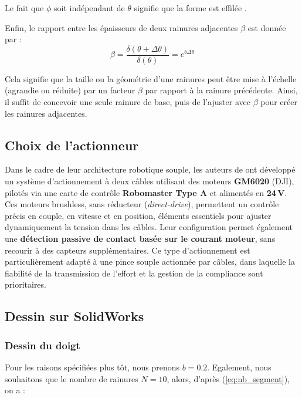 \documentclass[a4paper, 11pt]{report}
\begin{document}
            Le fait que $\phi$ soit indépendant de $\theta$ signifie que la forme est effilée \cite{wang_spirobs_2025}.

            Enfin, le rapport entre les épaisseurs de deux rainures adjacentes \(\beta\) est donnée par :
            \begin{equation}
            \beta = \frac{\delta(\theta + \Delta\theta)}{\delta(\theta)} = e^{b \Delta\theta}
            \label{eq:beta}
            \end{equation}
            
            Cela signifie que la taille ou la géométrie d’une rainures peut être mise à l’échelle (agrandie ou réduite) par un facteur $\beta$ par rapport à la rainure précédente. Ainsi, il suffit de concevoir une seule rainure de base, puis de l’ajuster avec $\beta$ pour créer les rainures adjacentes.

    \subsection{Choix de l'actionneur}

        Dans le cadre de leur architecture robotique souple, les auteurs de \cite{wang_spirobs_2025} ont développé un système d’actionnement à deux câbles utilisant des moteurs \textbf{GM6020} (DJI), pilotés via une carte de contrôle \textbf{Robomaster Type A} et alimentés en \textbf{24\,V}. Ces moteurs brushless, sans réducteur (\emph{direct-drive}), permettent un contrôle précis en couple, en vitesse et en position, éléments essentiels pour ajuster dynamiquement la tension dans les câbles. Leur configuration permet également une \textbf{détection passive de contact basée sur le courant moteur}, sans recourir à des capteurs supplémentaires. Ce type d’actionnement est particulièrement adapté à une pince souple actionnée par câbles, dans laquelle la fiabilité de la transmission de l’effort et la gestion de la compliance sont prioritaires.
        
    \subsection{Dessin sur SolidWorks}

        \subsubsection{Dessin du doigt}

            Pour les raisons spécifiées plus tôt, nous prenons $b = 0.2$. Egalement, nous souhaitons que le nombre de rainures $N = 10$, alors, d'après (\ref{eq:nb_segment}), on a :
\end{document}

